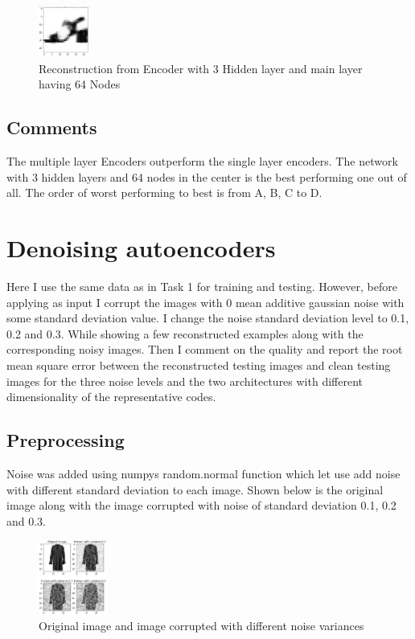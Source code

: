 \documentclass[conference]{IEEEtran}
\begin{document}
    \begin{figure}[H]
        \centering
        \captionsetup{justification=centering}
        \centering
            \includegraphics[width=0.15\textwidth]{21.png}
            \caption{Reconstruction from Encoder with 3 Hidden layer and main layer having 64 Nodes}
    \end{figure}

    \subsection{Comments}

    The multiple layer Encoders outperform the single layer encoders. The network with 3 hidden layers and
    64 nodes in the center is the best performing one out of all. The order of worst performing to best is from A, B, C to D. 

    \section{Denoising autoencoders}

    Here I use the same data as in Task 1 for training and testing.
    However, before applying as input I corrupt the images with 0 mean additive gaussian noise with
    some standard deviation value. I change the noise standard deviation level to 0.1, 0.2 and 0.3. 
    While showing a few reconstructed examples along with the corresponding noisy images.
    Then I comment on the quality and report the root mean square error between the reconstructed testing images and clean testing images for the three noise levels
    and the two architectures with different dimensionality of the representative codes.

    \subsection{Preprocessing}

    Noise was added using numpys random.normal function which let use add noise with different standard deviation to each image.
    Shown below is the original image along with the image corrupted with noise of standard deviation 0.1, 0.2 and 0.3.
    
    \begin{figure}[H]
        \centering
        \captionsetup{justification=centering}
        \centering
            \includegraphics[width=0.2\textwidth]{22.png}
            \caption{Original image and image corrupted with different noise variances}
    \end{figure}
\end{document}
